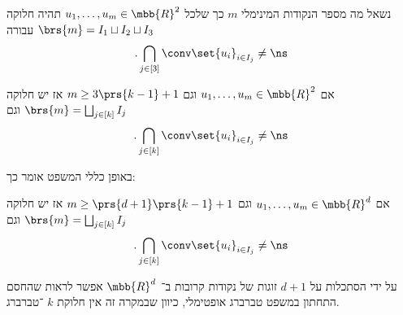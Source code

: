 \documentclass[a4paper,10pt,twoside,openany]{book}
\begin{document}
נשאל מה מספר הנקודות המינימלי
$m$
כך שלכל
$u_1, \ldots, u_m \in \mbb{R}^2$
תהיה חלוקה
$\brs{m} = I_1 \sqcup I_2 \sqcup I_3$
עבורה
\[\text{.} \bigcap_{j \in [3]} \conv\set{u_i}_{i \in I_j} \neq \ns\]

\begin{theorem}[טברברג]
אם
$u_1, \ldots, u_m \in \mbb{R}^2$
וגם
$m \geq 3\prs{k-1} + 1$
אז יש חלוקה
$\brs{m} = \bigsqcup_{j \in [k]} I_j$
וגם
\[\text{.} \bigcap_{j \in [k]} \conv\set{u_i}_{i \in I_j} \neq \ns\]
\end{theorem}

באופן כללי המשפט אומר כך:

\begin{theorem}
אם
$u_1, \ldots, u_m \in \mbb{R}^d$
וגם
$m \geq \prs{d+1}\prs{k-1} + 1$
אז יש חלוקה
$\brs{m} = \bigsqcup_{j \in [k]} I_j$
וגם
\[\text{.} \bigcap_{j \in [k]} \conv\set{u_i}_{i \in I_j} \neq \ns\]
\end{theorem}

\begin{remark}
על ידי הסתכלות על
$d+1$
זוגות של נקודות קרובות ב־%
$\mbb{R}^d$
אפשר לראות שהחסם התחתון במשפט טברברג אופטימלי, כיוון שבמקרה זה אין חלוקת
$k$%
־טברברג.
\end{remark}

\backmatter
\end{document}
